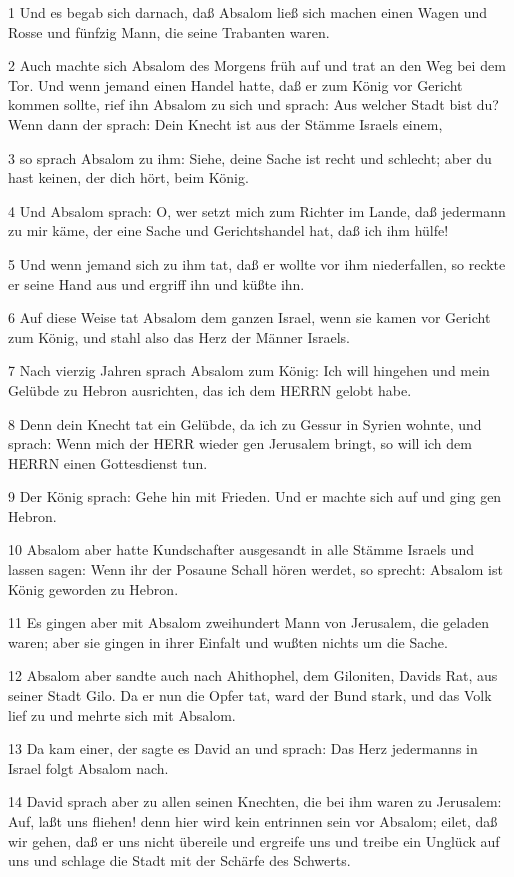 \par 1 Und es begab sich darnach, daß Absalom ließ sich machen einen Wagen und Rosse und fünfzig Mann, die seine Trabanten waren.
\par 2 Auch machte sich Absalom des Morgens früh auf und trat an den Weg bei dem Tor. Und wenn jemand einen Handel hatte, daß er zum König vor Gericht kommen sollte, rief ihn Absalom zu sich und sprach: Aus welcher Stadt bist du? Wenn dann der sprach: Dein Knecht ist aus der Stämme Israels einem,
\par 3 so sprach Absalom zu ihm: Siehe, deine Sache ist recht und schlecht; aber du hast keinen, der dich hört, beim König.
\par 4 Und Absalom sprach: O, wer setzt mich zum Richter im Lande, daß jedermann zu mir käme, der eine Sache und Gerichtshandel hat, daß ich ihm hülfe!
\par 5 Und wenn jemand sich zu ihm tat, daß er wollte vor ihm niederfallen, so reckte er seine Hand aus und ergriff ihn und küßte ihn.
\par 6 Auf diese Weise tat Absalom dem ganzen Israel, wenn sie kamen vor Gericht zum König, und stahl also das Herz der Männer Israels.
\par 7 Nach vierzig Jahren sprach Absalom zum König: Ich will hingehen und mein Gelübde zu Hebron ausrichten, das ich dem HERRN gelobt habe.
\par 8 Denn dein Knecht tat ein Gelübde, da ich zu Gessur in Syrien wohnte, und sprach: Wenn mich der HERR wieder gen Jerusalem bringt, so will ich dem HERRN einen Gottesdienst tun.
\par 9 Der König sprach: Gehe hin mit Frieden. Und er machte sich auf und ging gen Hebron.
\par 10 Absalom aber hatte Kundschafter ausgesandt in alle Stämme Israels und lassen sagen: Wenn ihr der Posaune Schall hören werdet, so sprecht: Absalom ist König geworden zu Hebron.
\par 11 Es gingen aber mit Absalom zweihundert Mann von Jerusalem, die geladen waren; aber sie gingen in ihrer Einfalt und wußten nichts um die Sache.
\par 12 Absalom aber sandte auch nach Ahithophel, dem Giloniten, Davids Rat, aus seiner Stadt Gilo. Da er nun die Opfer tat, ward der Bund stark, und das Volk lief zu und mehrte sich mit Absalom.
\par 13 Da kam einer, der sagte es David an und sprach: Das Herz jedermanns in Israel folgt Absalom nach.
\par 14 David sprach aber zu allen seinen Knechten, die bei ihm waren zu Jerusalem: Auf, laßt uns fliehen! denn hier wird kein entrinnen sein vor Absalom; eilet, daß wir gehen, daß er uns nicht übereile und ergreife uns und treibe ein Unglück auf uns und schlage die Stadt mit der Schärfe des Schwerts.
